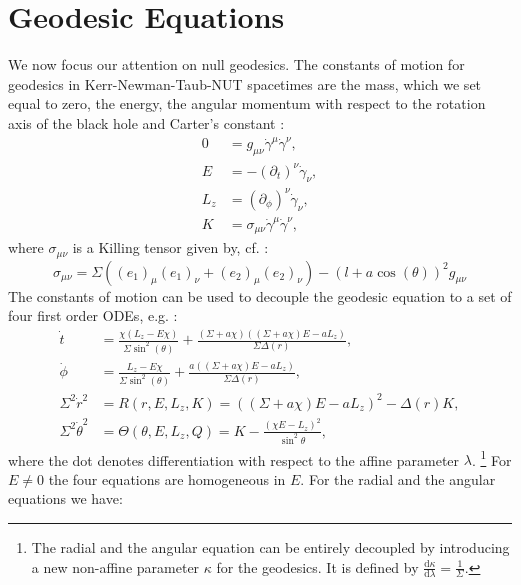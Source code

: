 \documentclass[reqno]{amsart}
\numberwithin{equation}{section}
\theoremstyle{plain}
\theoremstyle{definition}
\begin{document}
\section{Geodesic Equations}\label{sec:geodeq}
We now focus our attention on null geodesics. The constants of motion for geodesics in Kerr-Newman-Taub-NUT spacetimes  are the mass, which we set equal to zero, the energy, the angular momentum with respect to the rotation axis of the black hole and Carter's constant \cite{carter_global_1968}:
\begin{subequations}\label{eq:com}
\begin{align}
0&=g_{\mu\nu}\dot \gamma^\mu\dot \gamma^\nu , \\
E&= - (\partial_t)^\nu\dot \gamma_\nu, \\
L_z&= (\partial_\phi)^\nu \dot \gamma_\nu, \\
K &= \sigma _ {\mu \nu} \dot \gamma ^ {\mu} \dot \gamma ^ {\nu},
\end{align}
\end{subequations} 
where $\sigma_{\mu\nu}$ is a Killing tensor given by, cf. \cite{PhysRevD.76.084036}:
\begin{equation}
\sigma_{\mu \nu} = \Sigma ( (e_1)_\mu (e_1)_\nu + (e_2)_\mu (e_2)_\nu ) - (l + a \cos(\theta))^2 g_{\mu \nu}
\label{eq:Killing}
\end{equation}
The constants of motion can be used to decouple the geodesic equation to a set of four first order ODEs, e.g. \cite[p. 242]{MR1647491}:
\begin{subequations}\label{eq:eom}
\begin{align}
 \dot t &= \frac{\chi(L_z-E \chi)}{\Sigma \sin^2(\theta)}+\frac{(\Sigma+ a\chi)((\Sigma+a \chi)E-a L_z)}{\Sigma\Delta(r)},\\
\dot \phi &=\frac{L_z-E \chi}{\Sigma \sin^2(\theta)}+\frac{a((\Sigma+a \chi)E-a L_z)}{\Sigma\Delta(r)} ,\\
\Sigma ^2 \dot r ^2  &= R (r,E,L_z,K)= ((\Sigma+a \chi)E-aL_z)^2-\Delta(r) K,
\label{eq:radial}\\
\Sigma ^2 \dot \theta ^2 &= \Theta (\theta, E, L_z, Q) =  K -  \frac{(\chi E-L_z)^2}{\sin ^2 \theta}  ,
\label{eq:theta}
\end{align}
\end{subequations}
where the dot denotes differentiation with respect to the affine parameter $\lambda$. \footnote{The radial and the angular equation can be entirely decoupled by introducing a new non-affine parameter $\kappa$ for the geodesics. It is defined by $\frac{\mathrm{d} \kappa}{\mathrm d \lambda}=\frac{1}{\Sigma}$.} For $E \neq 0$ the four equations are homogeneous in $E$. For the radial and the angular equations we have: 
\end{document}
